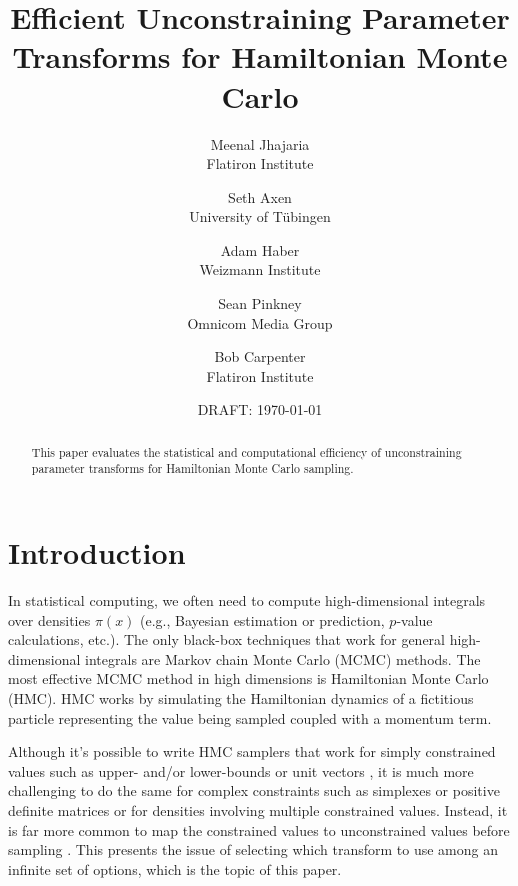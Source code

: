 \documentclass[11pt]{article}
\begin{document}
\title{Efficient Unconstraining
  Parameter Transforms for Hamiltonian Monte Carlo}
\author{Meenal Jhajaria \\ \small Flatiron Institute 
\and Seth Axen \\ \small University of T\"ubingen 
\and Adam Haber \\ \small Weizmann Institute 
\and Sean Pinkney \\ \small Omnicom Media Group
\and Bob Carpenter \\ \small Flatiron Institute}
\date{DRAFT: \today}
\maketitle


\begin{abstract}
  \noindent
  This paper evaluates the statistical and computational
  efficiency of unconstraining parameter transforms for Hamiltonian
  Monte Carlo sampling.
\end{abstract}

\section{Introduction}

In statistical computing, we often need to compute high-dimensional
integrals over densities $\pi(x)$ (e.g., Bayesian estimation or
prediction, $p$-value calculations, etc.).  The only black-box
techniques that work for general high-dimensional integrals are
Markov chain Monte Carlo (MCMC) methods.  The most effective MCMC
method in high dimensions is Hamiltonian Monte Carlo (HMC).  HMC works
by simulating the Hamiltonian dynamics of a fictitious particle
representing the value being sampled coupled with a momentum term.

Although it's possible to write HMC samplers that work for simply
constrained values such as upper- and/or lower-bounds
\cite{neal2011mcmc} or unit vectors \cite{byrne2013geodesic}, it is
much more challenging to do the same for complex constraints such as
simplexes or positive definite matrices or for densities involving
multiple constrained values.  Instead, it is far more common to map
the constrained values to unconstrained values before sampling
\cite{}.  This presents the issue of selecting which transform to use
among an infinite set of options, which is the topic of this paper.

\end{document}
